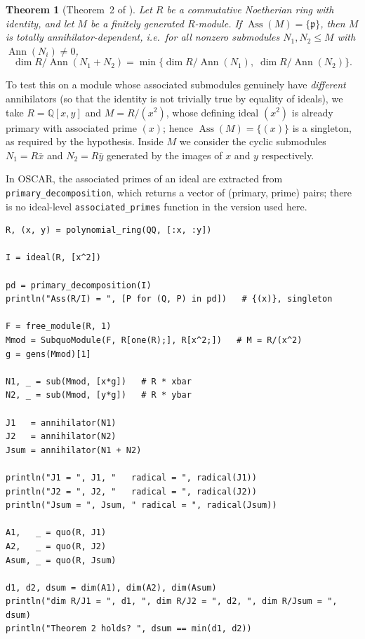 \documentclass[11pt]{article}
\newtheorem{theorem}{Theorem}
\newcommand{\Ann}{\operatorname{Ann}}
\newcommand{\Ass}{\operatorname{Ass}}
\begin{document}
\begin{theorem}[Theorem~2 of \cite{pekin-ozkaya-2026}]
\label{thm:2}
Let $R$ be a commutative Noetherian ring with identity, and let $M$ be a
finitely generated $R$-module. If $\Ass(M)=\{\mathfrak p\}$, then $M$ is
totally annihilator-dependent, i.e.\ for all nonzero submodules
$N_1,N_2\le M$ with $\Ann(N_i)\neq 0$,
\[
  \dim R/\Ann(N_1+N_2) = \min\{\dim R/\Ann(N_1),\;
  \dim R/\Ann(N_2)\}.
\]
\end{theorem}

To test this on a module whose associated submodules genuinely have
\emph{different} annihilators (so that the identity is not trivially true
by equality of ideals), we take $R=\mathbb Q[x,y]$ and
$M=R/(x^2)$, whose defining ideal $(x^2)$ is already primary with
associated prime $(x)$; hence $\operatorname{Ass}(M)=\{(x)\}$ is a
singleton, as required by the hypothesis. Inside $M$ we consider the
cyclic submodules $N_1=R\bar x$ and $N_2=R\bar y$ generated by the images
of $x$ and $y$ respectively.

In OSCAR, the associated primes of an ideal are extracted from
\texttt{primary\_decomposition}, which returns a vector of
(primary, prime) pairs; there is no ideal-level
\texttt{associated\_primes} function in the version used here.

\begin{lstlisting}
R, (x, y) = polynomial_ring(QQ, [:x, :y])

I = ideal(R, [x^2])

pd = primary_decomposition(I)
println("Ass(R/I) = ", [P for (Q, P) in pd])   # {(x)}, singleton

F = free_module(R, 1)
Mmod = SubquoModule(F, R[one(R);], R[x^2;])   # M = R/(x^2)
g = gens(Mmod)[1]

N1, _ = sub(Mmod, [x*g])   # R * xbar
N2, _ = sub(Mmod, [y*g])   # R * ybar

J1   = annihilator(N1)
J2   = annihilator(N2)
Jsum = annihilator(N1 + N2)

println("J1 = ", J1, "   radical = ", radical(J1))
println("J2 = ", J2, "   radical = ", radical(J2))
println("Jsum = ", Jsum, " radical = ", radical(Jsum))

A1,   _ = quo(R, J1)
A2,   _ = quo(R, J2)
Asum, _ = quo(R, Jsum)

d1, d2, dsum = dim(A1), dim(A2), dim(Asum)
println("dim R/J1 = ", d1, ", dim R/J2 = ", d2, ", dim R/Jsum = ", dsum)
println("Theorem 2 holds? ", dsum == min(d1, d2))
\end{lstlisting}
\end{document}

